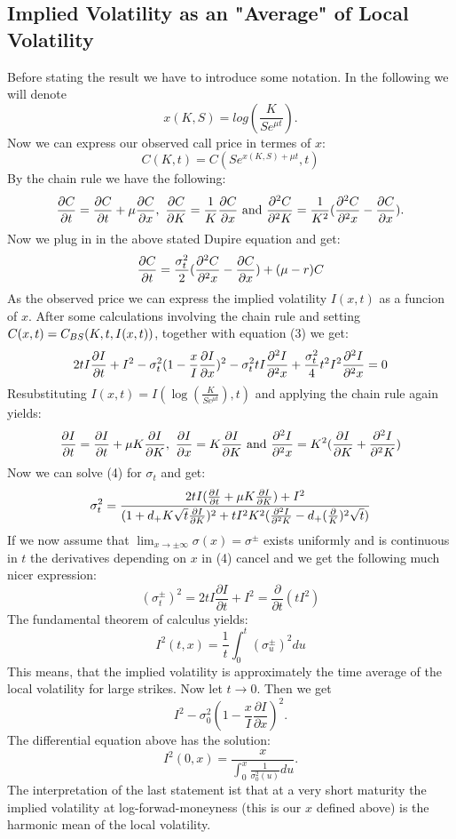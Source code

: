 \subsection{Implied Volatility as an "Average" of Local Volatility}
Before stating the result we have to introduce some notation. In the following we will denote 
$$x(K,S)=log(\frac{K}{Se^{\mu t}}).$$
Now we can express our observed call price in termes of $x$:
$$C(K,t)=C(Se^{x(K,S)+\mu t},t)$$
By the chain rule we have the following:
$$\frac{\partial C}{\partial t}=\frac{\partial C}{\partial t}+\mu\frac{\partial C}{\partial x},~\frac{\partial C}{\partial K}=\frac{1}{K}\frac{\partial C}{\partial x}\text{ and }\frac{\partial^2 C}{\partial^2 K}=\frac{1}{K^2}(\frac{\partial^2 C}{\partial^2 x}-\frac{\partial C}{\partial x}).$$
Now we plug in in the above stated Dupire equation and get:
\begin{align}\frac{\partial C}{\partial t}=\frac{\sigma_t^2}{2}(\frac{\partial^2 C}{\partial^2 x}-\frac{\partial C}{\partial x})+(\mu-r)C\end{align}
As the observed price we can express the implied volatility $I(x,t)$ as a funcion of $x$. After some calculations involving the chain rule and setting $C(x,t)=C_{BS}(K,t,I(x,t))$, together with equation (3) we get:
\begin{align}2tI\frac{\partial I}{\partial t}+I^2-\sigma_t^2(1-\frac{x}{I}\frac{\partial I}{\partial x})^2-\sigma_t^2 t I\frac{\partial^2 I}{\partial^2 x}+ \frac{\sigma_t^2}{4}t^2I^2\frac{\partial^2I}{\partial^2x}=0\end{align}
Resubstituting $I(x,t)=I(\log(\frac{K}{Se^{\mu t}}),t)$ and applying the chain rule again yields:
$$\frac{\partial I}{\partial t}= \frac{\partial I}{\partial t}+\mu K \frac{\partial I}{\partial K},~ \frac{\partial I}{\partial x}= K\frac{\partial I}{\partial K}\text{ and } \frac{\partial^2 I}{\partial^2 x}=K^2(\frac{\partial I}{\partial K}+\frac{\partial^2 I}{\partial^2 K})$$
Now we can solve (4) for $\sigma_t$ and get:
$$\sigma_t^2=\frac{2tI(\frac{\partial I}{\partial t}+\mu K\frac{\partial I}{\partial K})+I^2}{(1+d_+K\sqrt{t}\frac{\partial I}{\partial K})^2 + tI^2K^2(\frac{\partial^2 I}{\partial^2 K}-d_+(\frac{\partial}{K})^2\sqrt{t})}$$
If we now assume that $\lim_{x \rightarrow \pm \infty}\sigma(x)=\sigma^\pm$ exists uniformly and is continuous in $t$ the derivatives depending on $x$ in (4) cancel and we get the following much nicer expression:
$$(\sigma_t^\pm)^2=2tI\frac{\partial I}{\partial t} + I^2=\frac{\partial}{\partial t}(tI^2)$$
The fundamental theorem of calculus yields:
$$I^2(t,x)=\frac{1}{t}\int_{0}^t(\sigma_u^\pm)^2du$$
This means, that the implied volatility is approximately the time average of the local volatility for large strikes.
Now let $t \rightarrow 0$. Then we get
$$I^2-\sigma_0^2( 1-\frac{x}{I}\frac{\partial I}{\partial x})^2.$$
The differential equation above has the solution:
$$I^2(0,x)=\frac{x}{\int_0^x\frac{1}{\sigma_0^2(u)}du}.$$
The interpretation of the last statement ist that at a very short maturity the implied volatility at log-forwad-moneyness (this is our $x$ defined above) is the harmonic mean of the local volatility.